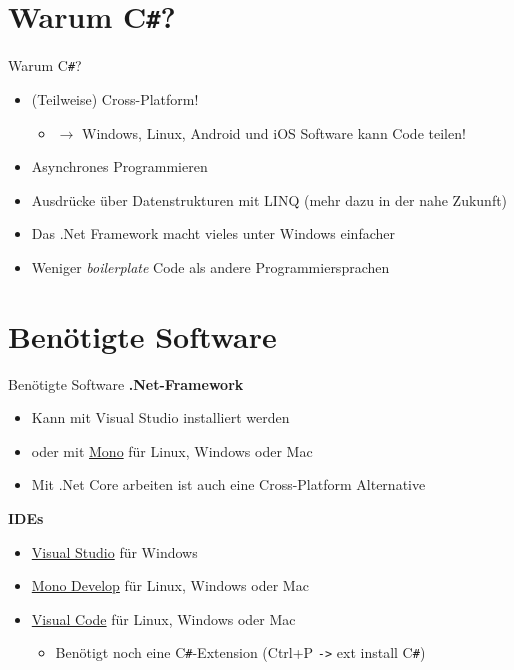 \section{Warum C\texttt{\#}?}
\begin{frame}{Warum C\texttt{\#}?}
\begin{itemize}
\item (Teilweise) Cross-Platform!
\begin{itemize}
    \item $\rightarrow$ Windows, Linux, Android und iOS Software kann Code teilen!
\end{itemize}
\item Asynchrones Programmieren 
\item Ausdrücke über Datenstrukturen mit LINQ (mehr dazu in der nahe Zukunft)
\item Das .Net Framework macht vieles unter Windows einfacher
\item Weniger \emph{boilerplate} Code als andere Programmiersprachen
\end{itemize}
\end{frame}
\section{Benötigte Software}
\begin{frame}{Benötigte Software}
	\textbf{.Net-Framework}
	\begin{itemize}
		\item Kann mit Visual Studio installiert werden
		\item oder mit \href{http://www.mono-project.com/}{Mono} für Linux, Windows oder Mac
		\item Mit .Net Core arbeiten ist auch eine Cross-Platform Alternative
	\end{itemize}
	\textbf{IDEs}
	\begin{itemize}
		\item \href{https://www.visualstudio.com/}{Visual Studio} für Windows
		\item \href{http://www.monodevelop.com/}{Mono Develop} für Linux, Windows oder Mac
		\item \href{https://www.visualstudio.com/de-de/products/code-vs.aspx}{Visual Code} für Linux, Windows oder Mac
		\begin{itemize}
			\item Benötigt noch eine C\texttt{\#}-Extension (Ctrl+P \texttt{->} ext install C\texttt{\#})
		\end{itemize}
	\end{itemize}
\end{frame}

